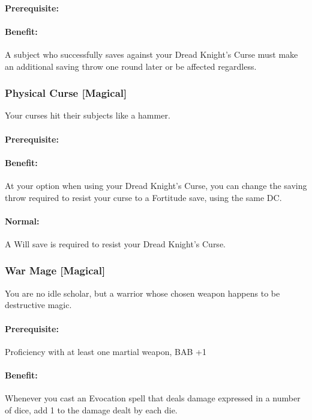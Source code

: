 \paragraph{Prerequisite:} 
\paragraph{Benefit:} A subject who successfully saves against your Dread Knight's Curse must make an additional saving throw one round later or be affected regardless.

\subsubsection[Physical Curse]{Physical Curse [Magical]}
\label{Feat:PhysicalCurse}
Your curses hit their subjects like a hammer.
\paragraph{Prerequisite:} 
\paragraph{Benefit:} At your option when using your Dread Knight's Curse, you can change the saving throw required to resist your curse to a Fortitude save, using the same DC.
\paragraph{Normal:} A Will save is required to resist your Dread Knight's Curse.

\subsubsection[War Mage]{War Mage [Magical]}
\label{Feat:WarMage}
You are no idle scholar, but a warrior whose chosen weapon happens to be destructive magic.

\paragraph{Prerequisite:} Proficiency with at least one martial weapon, BAB +1

\paragraph{Benefit:} Whenever you cast an Evocation spell that deals damage expressed in a number of dice, add 1 to the damage dealt by each die. 